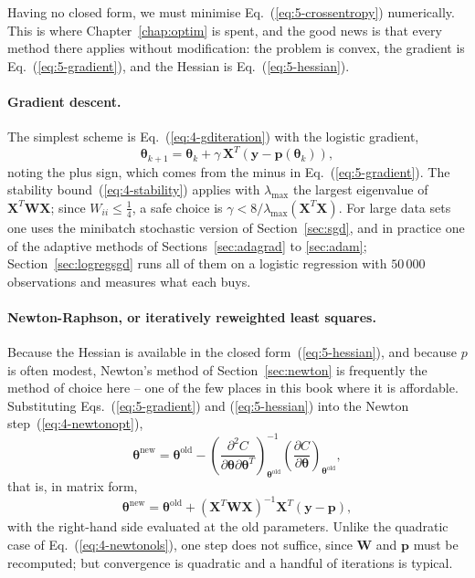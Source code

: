 Having no closed form, we must minimise Eq.~(\ref{eq:5-crossentropy})
numerically.  This is where Chapter~\ref{chap:optim} is spent, and the good
news is that every method there applies without modification: the problem is
convex, the gradient is Eq.~(\ref{eq:5-gradient}), and the Hessian is
Eq.~(\ref{eq:5-hessian}).

\paragraph{Gradient descent.}
The simplest scheme is Eq.~(\ref{eq:4-gditeration}) with the logistic
gradient,
\begin{equation}
  \bm{\theta}_{k+1} = \bm{\theta}_k
    + \gamma\,\bm{X}^{T}\left(\bm{y}-\bm{p}(\bm{\theta}_k)\right),
  \label{eq:5-gd}
\end{equation}
noting the plus sign, which comes from the minus in
Eq.~(\ref{eq:5-gradient}).  The stability
bound~(\ref{eq:4-stability}) applies with $\lambda_{\max}$ the largest
eigenvalue of $\bm{X}^{T}\bm{W}\bm{X}$; since $W_{ii}\le\tfrac14$, a safe
choice is $\gamma<8/\lambda_{\max}(\bm{X}^{T}\bm{X})$.  For large data sets one
uses the minibatch stochastic version of Section~\ref{sec:sgd}, and in
practice one of the adaptive methods of Sections~\ref{sec:adagrad} to
\ref{sec:adam}; Section~\ref{sec:logregsgd} runs all of them on a logistic
regression with $50\,000$ observations and measures what each buys.

\paragraph{Newton-Raphson, or iteratively reweighted least squares.}
Because the Hessian is available in the closed
form~(\ref{eq:5-hessian}), and because $p$ is often modest, Newton's method of
Section~\ref{sec:newton} is frequently the method of choice here -- one of the
few places in this book where it is affordable.  Substituting
Eqs.~(\ref{eq:5-gradient}) and (\ref{eq:5-hessian}) into the Newton
step~(\ref{eq:4-newtonopt}),
\begin{equation}
  \bm{\theta}^{\mathrm{new}} = \bm{\theta}^{\mathrm{old}}
   - \left(\frac{\partial^{2}C}
      {\partial\bm{\theta}\partial\bm{\theta}^{T}}\right)^{-1}_{\bm{\theta}^{\mathrm{old}}}
     \left(\frac{\partial C}{\partial\bm{\theta}}\right)_{\bm{\theta}^{\mathrm{old}}},
  \label{eq:5-newtonabstract}
\end{equation}
that is, in matrix form,
\begin{equation}
  \boxed{\;
  \bm{\theta}^{\mathrm{new}} = \bm{\theta}^{\mathrm{old}}
   + \left(\bm{X}^{T}\bm{W}\bm{X}\right)^{-1}
     \bm{X}^{T}\left(\bm{y}-\bm{p}\right), \;}
  \label{eq:5-newton}
\end{equation}
with the right-hand side evaluated at the old parameters.  Unlike the
quadratic case of Eq.~(\ref{eq:4-newtonols}), one step does not suffice, since
$\bm{W}$ and $\bm{p}$ must be recomputed; but convergence is quadratic and a
handful of iterations is typical.

